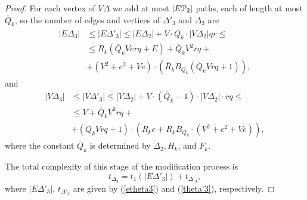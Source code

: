 \documentclass[a4paper,12pt]{article}
\newcommand{\G}{\Gamma }
\newcommand{\D}{\Delta }
\newcommand{\T}{\Theta }
\newcommand{\cP}{{\cal{P}}}
\numberwithin{equation}{section}
\numberwithin{figure}{section}
\begin{document}
\begin{proof}
For each vertex of $V\D$ we add at most $|E\cP_2|$ paths, each of
length at most $\overline Q_k$, so the number of edges and
vertices of $\D'_3$ and $\D_3$ are
\begin{equation}\label{etheta3}
\begin{split}
|E\D_3| &\le |E\D'_3|\le |E\D_2|+ V \cdot
\overline{Q}_k\cdot |V\D_2| q r \le \\
 &\le R_k(\overline{Q}_k V  e r q + E) +
 \overline{Q}_k V^2 r q +\\
 &+ (V^2 +e^2+V e)\cdot(\overline{R}_k B_{Q_k}(\overline{Q}_k V r q +1)),
\end{split}
\end{equation}
and
\begin{equation}\label{vtheta3}
\begin{split}
|V\D_3| &\le |V \D'_3|\le |V\D_2|+ V \cdot(\overline{Q}_k-1)\cdot |V\D_2|\cdot rq \le\\
 &\le V + \overline{Q}_k V^2 rq + \\
&+(\overline{Q}_k V rq +1)\cdot(R_k e +\overline{R}_k B_{Q_k}
\cdot(V^2 + e^2 + V e)),
\end{split}
\end{equation}
where the constant $\overline{Q}_k$ is determined  by $\D_2, H_k$, and
$F_k$.


The total complexity of this stage of the modification process is
\begin{equation}\label{theta3}
t_{\D_3} = t_1(|E\D'_3|)
+ t_{\D'_3},
\end{equation}
where $|E\D'_3|$, $t_{\D'_3}$ are given by (\ref{etheta3}) and
(\ref{theta'3}), respectively.



\end{proof}
\end{document}
